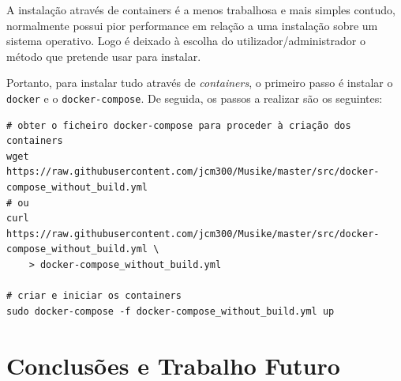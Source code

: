 \documentclass{article}
\begin{document}
A instalação através de containers é a menos trabalhosa e mais simples contudo, normalmente possui pior performance em relação a uma instalação sobre um sistema operativo. Logo é deixado à escolha do utilizador/administrador o método que pretende usar para instalar.

Portanto, para instalar tudo através de \textit{containers}, o primeiro passo é instalar o \texttt{docker} e o \texttt{docker-compose}. De seguida, os passos a realizar são os seguintes:

\small
\begin{framed}
\begin{verbatim}
# obter o ficheiro docker-compose para proceder à criação dos containers
wget https://raw.githubusercontent.com/jcm300/Musike/master/src/docker-compose_without_build.yml
# ou
curl https://raw.githubusercontent.com/jcm300/Musike/master/src/docker-compose_without_build.yml \ 
    > docker-compose_without_build.yml

# criar e iniciar os containers
sudo docker-compose -f docker-compose_without_build.yml up
\end{verbatim}
\end{framed}
\normalsize

\section{Conclusões e Trabalho Futuro}


\newpage 
\printbibliography

\begin{appendices}

\end{appendices}
\end{document}
